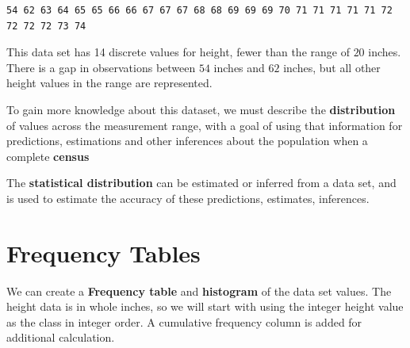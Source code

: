 \documentclass[nohyper,justified]{tufte-handout}\usepackage[]{graphicx}\usepackage[]{color}
\makeatletter
\newenvironment{kframe}{%
 \def\at@end@of@kframe{}%
 \ifinner\ifhmode%
  \def\at@end@of@kframe{\end{minipage}}%
  \begin{minipage}{\columnwidth}%
 \fi\fi%
 \def\FrameCommand##1{\hskip\@totalleftmargin \hskip-\fboxsep
 \colorbox{shadecolor}{##1}\hskip-\fboxsep
     \hskip-\linewidth \hskip-\@totalleftmargin \hskip\columnwidth}%
 \MakeFramed {\advance\hsize-\width
   \@totalleftmargin\z@ \linewidth\hsize
   \@setminipage}}%
 {\par\unskip\endMakeFramed%
 \at@end@of@kframe}
\newenvironment{knitrout}{}{} %
\makeatother
\begin{document}
\begin{knitrout}
\color{fgcolor}\begin{kframe}
\begin{verbatim}
54 62 63 64 65 65 66 66 67 67 67 68 68 69 69 69 70 71 71 71 71 71 72 72 72 72 73 74
\end{verbatim}
\end{kframe}
\end{knitrout}

This data set has 14 discrete values for height, fewer than the range of $20$ inches. There is a gap in observations between $54$ inches and $62$ inches, but all other height values in the range are represented.

To gain more knowledge about this dataset, we must describe the \textbf{distribution} of values across the measurement range, with a goal of using that information for predictions, estimations and other inferences about the population when a complete \textbf{census} 

The \textbf{statistical distribution} can be estimated or inferred from a data set, and 
is used to estimate the accuracy of these predictions, estimates, inferences.

\section{Frequency Tables}
We can create a \textbf{Frequency table} and \textbf{histogram} of the data set values. The height data is in whole inches, so we will start with using the integer height value as the class in integer order. A cumulative frequency column is added for additional calculation.
\end{document}
